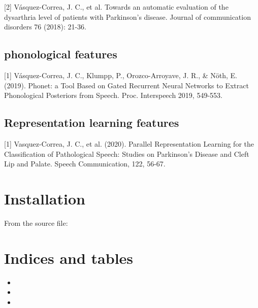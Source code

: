 \documentclass[letterpaper,10pt,english]{sphinxmanual}
\begin{document}
{[}2{]} Vásquez-Correa, J. C., et al. \sphinxquotedblleft{}Towards an automatic evaluation of the dysarthria level of patients with Parkinson's disease.\sphinxquotedblright{} Journal of communication disorders 76 (2018): 21-36.


\section{phonological features}
\label{\detokenize{reference:phonological-features}}
{[}1{]} Vásquez-Correa, J. C., Klumpp, P., Orozco-Arroyave, J. R., \& Nöth, E. (2019). Phonet: a Tool Based on Gated Recurrent Neural Networks to Extract Phonological Posteriors from Speech. Proc. Interspeech 2019, 549-553.


\section{Representation learning features}
\label{\detokenize{reference:representation-learning-features}}
{[}1{]} Vasquez-Correa, J. C., et al. (2020). Parallel Representation Learning for the Classification of Pathological Speech: Studies on Parkinson’s Disease and Cleft Lip and Palate. Speech Communication, 122, 56-67.


\chapter{Installation}
\label{\detokenize{index:installation}}
From the source file:

\begin{sphinxVerbatim}[commandchars=\\\{\}]
  
 
 
\end{sphinxVerbatim}


\chapter{Indices and tables}
\label{\detokenize{index:indices-and-tables}}\begin{itemize}
\item {} 

\item {} 

\item {} 

\end{itemize}
\end{document}
